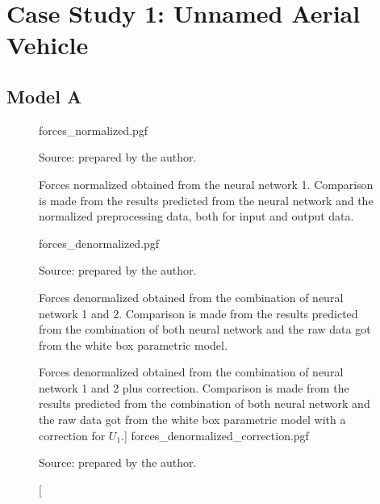 \section{Case Study 1: Unnamed Aerial Vehicle}

\subsection{Model A}

\begin{figure}[!htb]
    \centering
    \caption[Forces normalized obtained from the neural network 1]{Forces normalized obtained from the neural network 1. Comparison is made from the results predicted from the neural network and the normalized preprocessing data, both for input and output data.}
    {forces_normalized.pgf}

    {\footnotesize Source: prepared by the author.}
    \label{fig:forces_normalized}
\end{figure}

\begin{figure}[!htb]
    \centering
    \caption[Forces denormalized obtained from the combination of neural network 1 and 2]{Forces denormalized obtained from the combination of neural network 1 and 2. Comparison is made from the results predicted from the combination of both neural network and the raw data got from the white box parametric model.}
    {forces_denormalized.pgf}

    {\footnotesize Source: prepared by the author.}
    \label{fig:forces_denormalized}
\end{figure}

\begin{figure}[!htb]
    \centering
    \caption[Forces denormalized obtained from the combination of neural network 1 and 2 plus correction][Forces denormalized obtained from the combination of neural network 1 and 2 plus correction. Comparison is made from the results predicted from the combination of both neural network and the raw data got from the white box parametric model with a correction for \(U_1\).]
    {forces_denormalized_correction.pgf}

    {\footnotesize Source: prepared by the author.}
    \label{fig:forces_denormalized_correction}
\end{figure}

